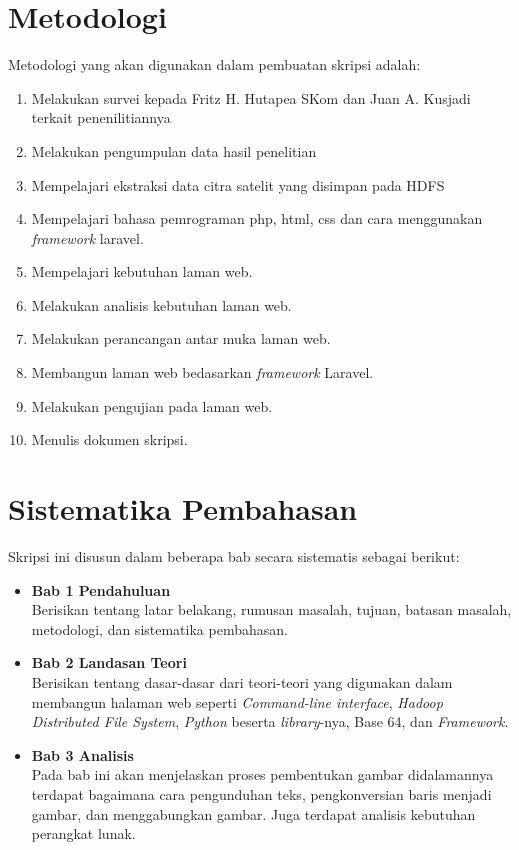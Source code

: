 \section{Metodologi}
\label{sec:metlit}
Metodologi yang akan digunakan dalam pembuatan skripsi adalah:
\begin{enumerate}
	\item Melakukan survei kepada Fritz H. Hutapea SKom dan Juan A. Kusjadi terkait penenilitiannya
	\item Melakukan pengumpulan data hasil penelitian
	\item Mempelajari ekstraksi data citra satelit yang disimpan pada HDFS
	\item Mempelajari bahasa pemrograman php, html, css dan cara menggunakan \emph{framework} laravel.
	\item Mempelajari kebutuhan laman web.
	\item Melakukan analisis kebutuhan laman web.
	\item Melakukan perancangan antar muka laman web.
	\item Membangun laman web bedasarkan \emph{framework} Laravel.
	\item Melakukan pengujian pada laman web.
	\item Menulis dokumen skripsi.
\end{enumerate}

\section{Sistematika Pembahasan}
\label{sec:sispem}

Skripsi ini disusun dalam beberapa bab secara sistematis sebagai berikut:
\begin{itemize}
	\item \textbf{Bab 1 Pendahuluan} \\ 
	Berisikan tentang latar belakang, rumusan masalah, tujuan, batasan masalah, metodologi, dan sistematika pembahasan.
	\item \textbf{Bab 2 Landasan Teori} \\ 
	Berisikan tentang dasar-dasar dari teori-teori yang digunakan dalam membangun halaman web seperti \textit{Command-line interface}, \textit{Hadoop Distributed File System}, \textit{Python} beserta \textit{library}-nya, Base 64, dan \textit{Framework}.
	\item \textbf{Bab 3 Analisis} \\ 
	Pada bab ini akan menjelaskan proses pembentukan gambar didalamannya terdapat bagaimana cara pengunduhan teks, pengkonversian baris menjadi gambar, dan menggabungkan gambar. Juga terdapat analisis kebutuhan perangkat lunak.
	
\end{itemize}
